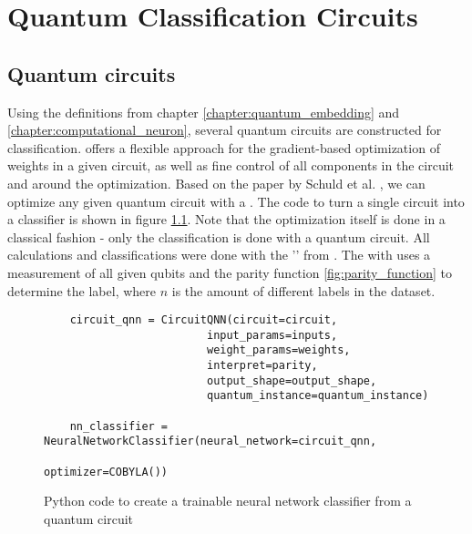 
\chapter{Quantum Classification Circuits} %

\label{Chapter3}

\section{Quantum circuits}
\label{chapter:quantum_circuits}

Using the definitions from chapter \ref{chapter:quantum_embedding} and \ref{chapter:computational_neuron}, several quantum circuits are constructed for classification.  offers a flexible approach for the gradient-based optimization of weights in a given circuit, as well as fine control of all components in the circuit and around the optimization. Based on the paper by Schuld et al. \cite{schuld_evaluating_2019}, we can optimize any given quantum circuit with a \cite{qiskit_neural_nodate}. The code to turn a single circuit into a classifier is shown in figure \ref{fig:code_qnn}. Note that the optimization itself is done in a classical fashion - only the classification is done with a quantum circuit. All calculations and classifications were done with the '' from . The  with  uses a measurement of all given qubits and the parity function \ref{fig:parity_function} to determine the label, where $n$ is the amount of different labels in the dataset.

\begin{figure}[!ht]
    \centering
    \begin{verbatim}
    circuit_qnn = CircuitQNN(circuit=circuit,    
                         input_params=inputs,
                         weight_params=weights,
                         interpret=parity,
                         output_shape=output_shape,
                         quantum_instance=quantum_instance)

    nn_classifier = NeuralNetworkClassifier(neural_network=circuit_qnn, 
                                            optimizer=COBYLA())
    \end{verbatim}
    \caption{Python code to create a trainable neural network classifier from a quantum circuit}
    \label{fig:code_qnn}
\end{figure}

